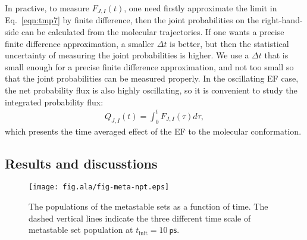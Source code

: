 \documentclass[aip,jcp,a4paper,preprint,onecolumn]{revtex4-1}
\begin{document}
In practive, to measure $ F_{J,I}(t)$, one need firstly approximate the limit
in Eq.~\eqref{eqn:tmp7} by finite difference, then the joint probabilities on
the right-hand-side can be calculated from the molecular trajectories.
If one wants a precise finite difference approximation, a smaller $\Delta t$ is
better, but then the statistical uncertainty of measuring the joint probabilities
is higher. We use a $\Delta t$ that is small enough for a precise finite difference
approximation, and not too small so that the joint probabilities can be measured
properly.
In the oscillating EF case, the net probability flux is also highly oscillating,
so it is convenient to study the integrated probability flux:
\begin{align}
  Q_{J,I} (t) = \int_0^t F_{J,I}(\tau)d \tau,
\end{align}
which presents the time averaged effect of the EF to the molecular conformation.





\subsection{Results and discusstions}
\begin{figure}
  \centering
  \texttt{[image: fig.ala/fig-meta-npt.eps]}
  \caption{The populations of the metastable sets as a function of time.
    The dashed vertical lines indicate the three different time scale of
  metastable set population at $t_{\textrm{init}} = 10~\textsf{ps}$.}
  \label{fig:tmp5}
\end{figure}
\end{document}
